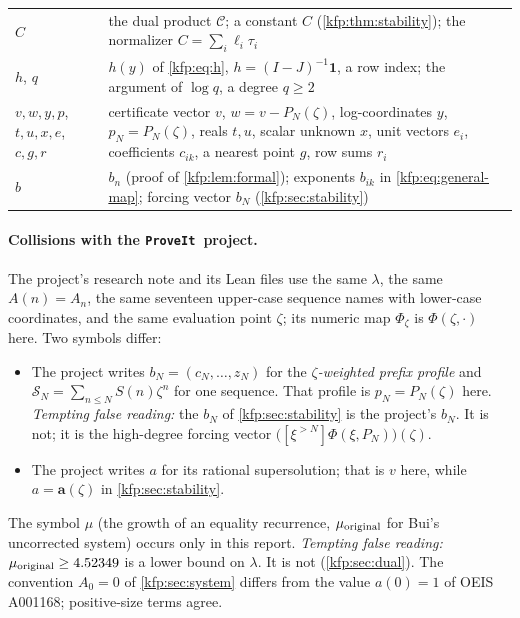 \documentclass[11pt,a4paper]{article}
\theoremstyle{definition}
\theoremstyle{remark}
\newcommand{\bA}{\boldsymbol a}
\newcommand{\bone}{\boldsymbol 1}
\newcommand{\tail}[2]{[\xi^{>#1}]#2}
\newcommand{\repo}{\texttt{ProveIt}}
\begin{document}
\begin{center}
\begin{tabular}{@{}>{\raggedright\arraybackslash}p{}>{\raggedright\arraybackslash}p{}@{}}
$C$ & the dual product $\mathcal C$; a constant $C$ (\cref{kfp:thm:stability}); the normalizer $C=\sum_i\ell_i\tau_i$\\
$h$, $q$ & $h(y)$ of \eqref{kfp:eq:h}, $h=(I-J)^{-1}\bone$, a row index; the argument of $\log q$, a degree $q\geq2$\\
$v,w,y,p$, $t,u,x,e$, $c,g,r$ & certificate vector $v$, $w=v-P_N(\zeta)$, log-coordinates $y$, $p_N=P_N(\zeta)$, reals $t,u$, scalar unknown $x$, unit vectors $e_i$, coefficients $c_{ik}$, a nearest point $g$, row sums $r_i$\\
$b$ & $b_n$ (proof of \cref{kfp:lem:formal}); exponents $b_{ik}$ in \eqref{kfp:eq:general-map}; forcing vector $b_N$ (\cref{kfp:sec:stability})\\
\bottomrule
\end{tabular}
\end{center}

\paragraph{Collisions with the \repo\ project.} The project's research note
\cite{repobound} and its Lean files use the same $\lambda$, the same
$A(n)=A_n$, the same seventeen upper-case sequence names with lower-case
coordinates, and the same evaluation point $\zeta$; its numeric map $\Phi_\zeta$
is $\Phi(\zeta,\cdot)$ here. Two symbols differ:
\begin{itemize}
\item The project writes $b_N=(c_N,\ldots,z_N)$ for the \emph{$\zeta$-weighted
 prefix profile} and $\mathcal S_N=\sum_{n\leq N}S(n)\zeta^n$ for one sequence.
 That profile is $p_N=P_N(\zeta)$ here. \emph{Tempting false reading:} the
 $b_N$ of \cref{kfp:sec:stability} is the project's $b_N$. It is not; it is
 the high-degree forcing vector $\bigl(\tail{N}{\Phi(\xi,P_N)}\bigr)(\zeta)$.
\item The project writes $a$ for its rational supersolution; that is $v$ here,
 while $a=\bA(\zeta)$ in \cref{kfp:sec:stability}.
\end{itemize}
The symbol $\mu$ (the growth of an equality recurrence, $\mu_{\rm original}$
for Bui's uncorrected system) occurs only in this report. \emph{Tempting false
reading:} $\mu_{\rm original}\geq4.52349$ is a lower bound on $\lambda$. It is
not (\cref{kfp:sec:dual}). The convention $A_0=0$ of \cref{kfp:sec:system}
differs from the value $a(0)=1$ of OEIS A001168; positive-size terms agree.
\end{document}
